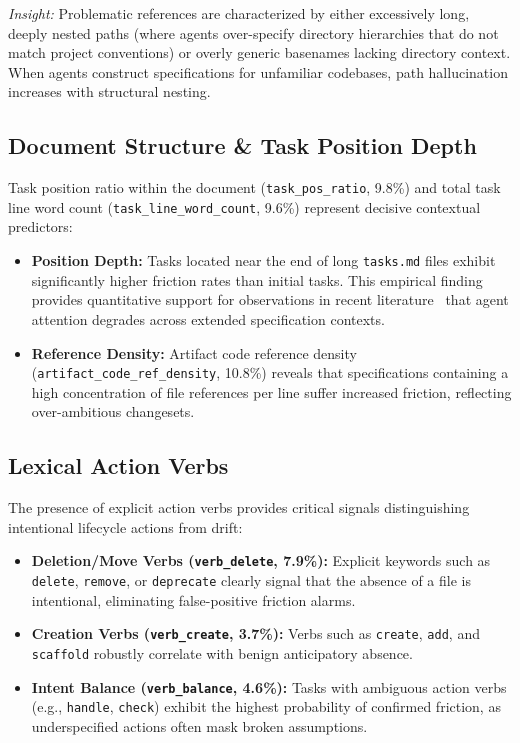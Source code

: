 \documentclass[10pt,conference]{IEEEtran}
\begin{document}
\textit{Insight:} Problematic references are characterized by either excessively long, deeply nested paths (where agents over-specify directory hierarchies that do not match project conventions) or overly generic basenames lacking directory context. When agents construct specifications for unfamiliar codebases, path hallucination increases with structural nesting.

\subsection{Document Structure \& Task Position Depth}
Task position ratio within the document (\texttt{task\_pos\_ratio}, 9.8\%) and total task line word count (\texttt{task\_line\_word\_count}, 9.6\%) represent decisive contextual predictors:
\begin{itemize}
    \item \textbf{Position Depth:} Tasks located near the end of long \texttt{tasks.md} files exhibit significantly higher friction rates than initial tasks. This empirical finding provides quantitative support for observations in recent literature~\cite{meske2025} that agent attention degrades across extended specification contexts.
    \item \textbf{Reference Density:} Artifact code reference density (\texttt{artifact\_code\_ref\_density}, 10.8\%) reveals that specifications containing a high concentration of file references per line suffer increased friction, reflecting over-ambitious changesets.
\end{itemize}

\subsection{Lexical Action Verbs}
The presence of explicit action verbs provides critical signals distinguishing intentional lifecycle actions from drift:
\begin{itemize}
    \item \textbf{Deletion/Move Verbs (\texttt{verb\_delete}, 7.9\%):} Explicit keywords such as \texttt{delete}, \texttt{remove}, or \texttt{deprecate} clearly signal that the absence of a file is intentional, eliminating false-positive friction alarms.
    \item \textbf{Creation Verbs (\texttt{verb\_create}, 3.7\%):} Verbs such as \texttt{create}, \texttt{add}, and \texttt{scaffold} robustly correlate with benign anticipatory absence.
    \item \textbf{Intent Balance (\texttt{verb\_balance}, 4.6\%):} Tasks with ambiguous action verbs (e.g., \texttt{handle}, \texttt{check}) exhibit the highest probability of confirmed friction, as underspecified actions often mask broken assumptions.
\end{itemize}
\end{document}
